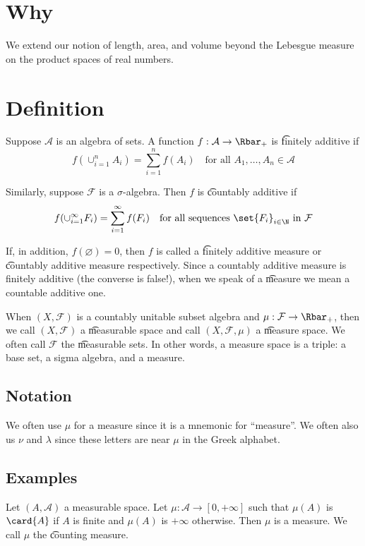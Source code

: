 
\section*{Why}

We extend our notion of length, area, and volume beyond the Lebesgue measure on the product spaces of real numbers.

\section*{Definition}

Suppose $\mathcal{A} $ is an algebra of sets.
A function $f: \mathcal{A}  \to \Rbar_+$ is \t{finitely additive} if
\[
f(\cup_{i = 1}^{n} A_i) = \sum_{i = 1}^{n} f(A_i) \quad \text{for all } A_1, \dots , A_n \in \mathcal{A}
\]

Similarly, suppose $\mathcal{F} $ is a $\sigma $-algebra.
Then $f$ is \t{countably additive} if
\[
f(\cup_{i = 1}^{\infty} F_i) = \sum_{i =1 }^{\infty} f(F_i) \quad \text{for all sequences } \set{F_i}_{i \in \N  } \text{ in } \mathcal{F}
\]

If, in addition, $f(\varnothing) = 0$, then $f$ is called a \t{finitely additive measure} or \t{countably additive measure} respectively.
Since a countably additive measure is finitely additive (the converse is false!), when we speak of a \t{measure} we mean a countable additive one.

When $(X, \mathcal{F} )$ is a countably unitable subset algebra and $\mu : \mathcal{F}  \to \Rbar_+$, then we call $(X, \mathcal{F} )$ a \t{measurable space} and call $(X, \mathcal{F} , \mu )$ a \t{measure space}.
We often call $\mathcal{F} $ the \t{measurable sets}.
In other words, a measure space is a triple: a base set, a sigma algebra, and a measure.

\subsection*{Notation}

We often use $\mu $ for a measure since it is a mnemonic for ``measure''.
We often also us $\nu $ and $\lambda $ since these letters are near $\mu $ in the Greek alphabet.

\subsection*{Examples}

\begin{example}
Let $(A, \mathcal{A} )$ a measurable space.
Let $\mu : \mathcal{A}  \to [0, +\infty]$ such that $\mu (A)$ is $\card{A}$ if $A$ is finite and $\mu (A)$ is $+\infty$ otherwise.
Then $\mu $ is a measure.
We call $\mu $ the \t{counting measure}.
\end{example}

